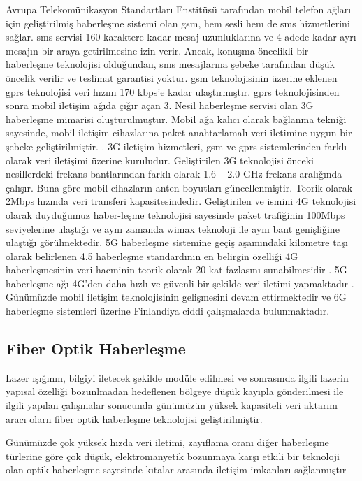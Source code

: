 Avrupa Telekomünikasyon Standartları Enstitüsü tarafından mobil telefon ağları için geliştirilmiş haberleşme sistemi olan \gls{gsm}, hem sesli hem de \gls{sms} hizmetlerini sağlar. \gls{sms} servisi 160 karaktere kadar mesaj uzunluklarına ve 4 adede kadar ayrı mesajın bir araya getirilmesine izin verir. Ancak, konuşma öncelikli bir haberleşme teknolojisi olduğundan, \gls{sms} mesajlarına şebeke tarafından düşük öncelik verilir ve teslimat garantisi yoktur. \gls{gsm} teknolojisinin üzerine eklenen \gls{gprs} teknolojisi veri hızını 170 kbps’e kadar ulaştırmıştır. \gls{gprs} teknolojisinden sonra mobil iletişim ağıda çığır açan 3. Nesil haberleşme servisi olan 3G haberleşme mimarisi oluşturulmuştur. Mobil ağa kalıcı olarak bağlanma tekniği sayesinde, mobil iletişim cihazlarına paket anahtarlamalı veri iletimine uygun bir şebeke geliştirilmiştir. \cite{smyth2003performance}. 3G iletişim hizmetleri, \gls{gsm} ve \gls{gprs} sistemlerinden farklı olarak veri iletişimi üzerine kuruludur. Geliştirilen 3G teknolojisi önceki nesillerdeki frekans bantlarından farklı olarak 1.6 -- 2.0 GHz frekans aralığında çalışır. Buna göre mobil cihazların anten boyutları güncellenmiştir. Teorik olarak 2Mbps hızında veri transferi kapasitesindedir. Geliştirilen ve ismini 4G teknolojisi olarak duyduğumuz haber-leşme teknolojisi sayesinde paket trafiğinin 100Mbps seviyelerine ulaştığı ve aynı zamanda \gls{wimax} teknoloji ile aynı bant genişliğine ulaştığı görülmektedir. 5G haberleşme sistemine geçiş aşamındaki kilometre taşı olarak belirlenen 4.5 haberleşme standardının en belirgin özelliği 4G haberleşmesinin veri hacminin teorik olarak 20 kat fazlasını sunabilmesidir \cite{routray20164}. 5G haberleşme ağı 4G’den daha hızlı ve güvenli bir şekilde veri iletimi yapmaktadır \cite{mishra2016mechanism}. Günümüzde mobil iletişim teknolojisinin gelişmesini devam ettirmektedir ve 6G haberleşme sistemleri üzerine Finlandiya ciddi çalışmalarda bulunmaktadır.

\subsection{Fiber Optik Haberleşme}

Lazer ışığının, bilgiyi iletecek şekilde modüle edilmesi ve sonrasında ilgili lazerin yapısal özelliği bozunlmadan hedeflenen bölgeye düşük kayıpla gönderilmesi ile ilgili yapılan çalışmalar sonucunda günümüzün yüksek kapasiteli veri aktarım aracı olarn fiber optik haberleşme teknolojisi geliştirilmiştir.

Günümüzde çok yüksek hızda veri iletimi, zayıflama oranı diğer haberleşme türlerine göre çok düşük, elektromanyetik bozunmaya karşı etkili bir teknoloji olan optik haberleşme sayesinde kıtalar arasında iletişim imkanları sağlanmıştır \cite{saleh2019fundamentals}

